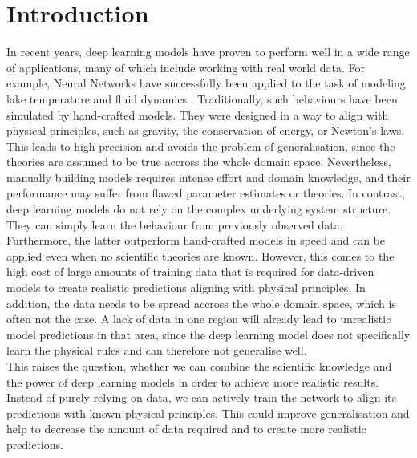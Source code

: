 \label{section:introduction}
\section{Introduction}

In recent years, deep learning models have proven to perform well in a wide range of applications, many of which include working with real world data. For example, Neural Networks have successfully been applied to the task of modeling lake temperature \cite{DBLP:journals/corr/abs-1710-11431} and fluid dynamics \cite{DBLP:journals/corr/SinghMD16}. Traditionally, such behaviours have been simulated by hand-crafted models. They were designed in a way to align with physical principles, such as gravity, the conservation of energy, or Newton's laws. This leads to high precision and avoids the problem of generalisation, since the theories are assumed to be true accross the whole domain space. Nevertheless, manually building models requires intense effort and domain knowledge, and their performance may suffer from flawed parameter estimates or theories. In contrast, deep learning models do not rely on the complex underlying system structure. They can simply learn the behaviour from previously observed data. Furthermore, the latter outperform hand-crafted models in speed and can be applied even when no scientific theories are known. However, this comes to the high cost of large amounts of training data that is required for data-driven models to create realistic predictions aligning with physical principles. In addition, the data needs to be spread accross the whole domain space, which is often not the case. A lack of data in one region will already lead to unrealistic model predictions in that area, since the deep learning model does not specifically learn the physical rules and can therefore not generalise well.\\
\indent This raises the question, whether we can combine the scientific knowledge and the power of deep learning models in order to achieve more realistic results. Instead of purely relying on data, we can actively train the network to align its predictions with known physical principles. This could improve generalisation and help to decrease the amount of data required and to create more realistic predictions.\\


\clearpage

